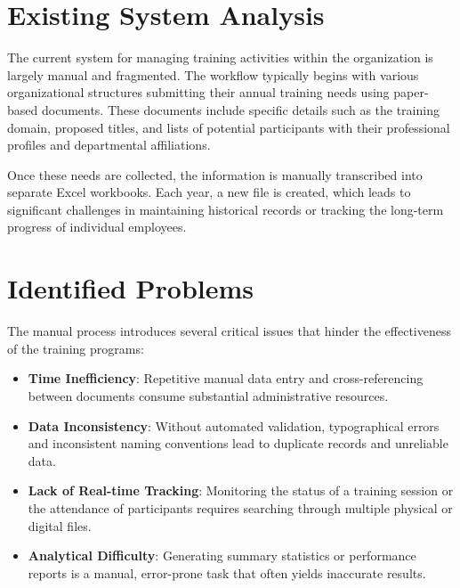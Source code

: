 \section{Existing System Analysis}
The current system for managing training activities within the organization is largely manual and fragmented. The workflow typically begins with various organizational structures submitting their annual training needs using paper-based documents. These documents include specific details such as the training domain, proposed titles, and lists of potential participants with their professional profiles and departmental affiliations.

Once these needs are collected, the information is manually transcribed into separate Excel workbooks. Each year, a new file is created, which leads to significant challenges in maintaining historical records or tracking the long-term progress of individual employees.

\section{Identified Problems}
The manual process introduces several critical issues that hinder the effectiveness of the training programs:
\begin{itemize}
    \item \textbf{Time Inefficiency}: Repetitive manual data entry and cross-referencing between documents consume substantial administrative resources.
    \item \textbf{Data Inconsistency}: Without automated validation, typographical errors and inconsistent naming conventions lead to duplicate records and unreliable data.
    \item \textbf{Lack of Real-time Tracking}: Monitoring the status of a training session or the attendance of participants requires searching through multiple physical or digital files.
    \item \textbf{Analytical Difficulty}: Generating summary statistics or performance reports is a manual, error-prone task that often yields inaccurate results.
\end{itemize}

